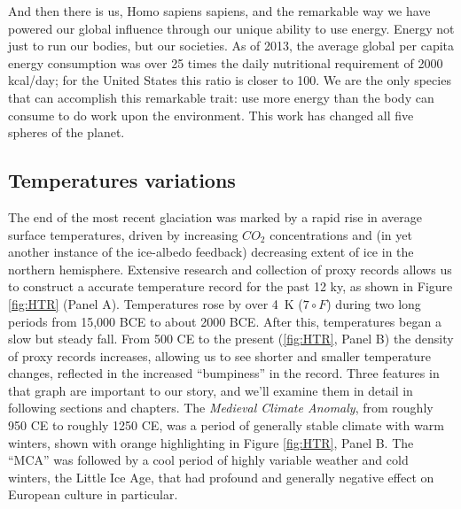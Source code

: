 \documentclass[amstex,12pt]{book}
\begin{document}
 
And then there is us, Homo sapiens sapiens, and the remarkable way we have powered our global influence through our unique ability to use energy. Energy not just to run our bodies, but our societies. As of 2013, the average global per capita energy consumption was over 25 times the daily nutritional requirement of 2000 kcal/day; for the United States this ratio is closer to 100. We are the only species that can accomplish this remarkable trait: use more energy than the body can consume to do work upon the environment. This work has changed all five spheres of the planet.

\subsection{Temperatures variations}
The end of the most recent glaciation was marked by a rapid rise in average surface temperatures, driven by increasing $CO_2$ concentrations and (in yet another instance of the ice-albedo feedback) decreasing extent of ice in the northern hemisphere. Extensive research and collection of proxy records allows us to construct a accurate temperature record for the past 12 ky, as shown in Figure \ref{fig:HTR} (Panel A). Temperatures rose by over \SI{4}{\kelvin} ($7\circ F$) during two long periods from 15,000 BCE to about 2000 BCE. After this, temperatures began a slow but steady fall. From 500 CE to the present (\ref{fig:HTR}, Panel B) the density of proxy records increases, allowing us to see shorter and smaller temperature changes, reflected in the increased ``bumpiness'' in the record. Three features in that graph are important to our story, and we'll examine them in detail in following sections and chapters. The \emph{Medieval Climate Anomaly}, from roughly 950 CE to roughly 1250 CE, was a period of generally stable climate with warm winters, shown with orange highlighting in Figure \ref{fig:HTR}, Panel B. The ``MCA'' was followed by a cool period of highly variable weather and cold winters, the Little Ice Age, that had profound and generally negative effect on European culture in particular.\\
\end{document}
